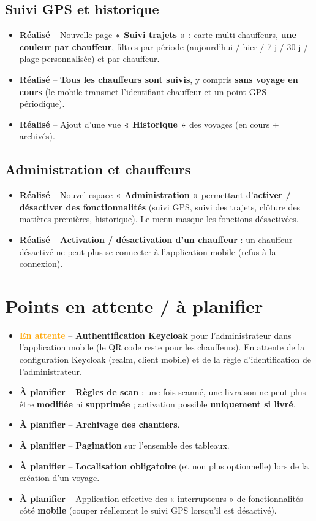 \documentclass[11pt,a4paper]{article}
\newcommand{\fait}{\textcolor{vert}{\textbf{Réalisé}}}
\newcommand{\encours}{\textcolor{orange}{\textbf{En attente}}}
\newcommand{\aplanifier}{\textcolor{gris}{\textbf{À planifier}}}
\begin{document}
\subsection{Suivi GPS et historique}
\begin{itemize}[leftmargin=*, itemsep=2pt]
  \item \fait{} -- Nouvelle page \textbf{« Suivi trajets »} : carte multi-chauffeurs, \textbf{une couleur par chauffeur}, filtres par période (aujourd'hui / hier / 7 j / 30 j / plage personnalisée) et par chauffeur.
  \item \fait{} -- \textbf{Tous les chauffeurs sont suivis}, y compris \textbf{sans voyage en cours} (le mobile transmet l'identifiant chauffeur et un point GPS périodique).
  \item \fait{} -- Ajout d'une vue \textbf{« Historique »} des voyages (en cours + archivés).
\end{itemize}

\subsection{Administration et chauffeurs}
\begin{itemize}[leftmargin=*, itemsep=2pt]
  \item \fait{} -- Nouvel espace \textbf{« Administration »} permettant d'\textbf{activer / désactiver des fonctionnalités} (suivi GPS, suivi des trajets, clôture des matières premières, historique). Le menu masque les fonctions désactivées.
  \item \fait{} -- \textbf{Activation / désactivation d'un chauffeur} : un chauffeur désactivé ne peut plus se connecter à l'application mobile (refus à la connexion).
\end{itemize}

\section{Points en attente / à planifier}
\begin{itemize}[leftmargin=*, itemsep=2pt]
  \item \encours{} -- \textbf{Authentification Keycloak} pour l'administrateur dans l'application mobile (le QR code reste pour les chauffeurs). En attente de la configuration Keycloak (realm, client mobile) et de la règle d'identification de l'administrateur.
  \item \aplanifier{} -- \textbf{Règles de scan} : une fois scanné, une livraison ne peut plus être \textbf{modifiée} ni \textbf{supprimée} ; activation possible \textbf{uniquement si livré}.
  \item \aplanifier{} -- \textbf{Archivage des chantiers}.
  \item \aplanifier{} -- \textbf{Pagination} sur l'ensemble des tableaux.
  \item \aplanifier{} -- \textbf{Localisation obligatoire} (et non plus optionnelle) lors de la création d'un voyage.
  \item \aplanifier{} -- Application effective des « interrupteurs » de fonctionnalités côté \textbf{mobile} (couper réellement le suivi GPS lorsqu'il est désactivé).
\end{itemize}
\end{document}
